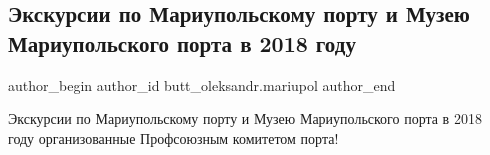  
 
 
 
 

\subsection{Экскурсии по Мариупольскому порту и Музею Мариупольского порта в 2018 году}
\label{sec:24_01_2023.fb.butt_oleksandr.mariupol.1.ekskursii_po_mariupo}

\ifcmt
 author_begin
   author_id butt_oleksandr.mariupol
 author_end
\fi

Экскурсии по Мариупольскому порту и Музею Мариупольского порта в 2018 году
организованные Профсоюзным комитетом порта! 🥰💐

